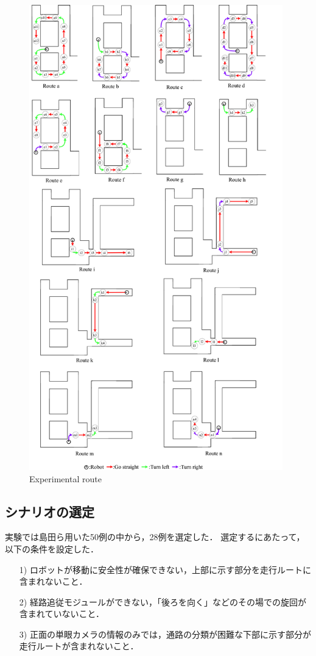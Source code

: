 \begin{figure}
  \centering
  \includegraphics[width=110mm]{images/pdf/ishiguro/route.pdf}
  \caption{Experimental route}
  \label{fig:route}
\end{figure}

\newpage
\subsection{シナリオの選定}
実験では島田ら用いた50例の中から，28例を選定した．
選定するにあたって，以下の条件を設定した．

\begin{enumerate}
  \item [1)] ロボットが移動に安全性が確保できない，上部に示す部分を走行ルートに含まれないこと．
  \item [2)] 経路追従モジュールができない，「後ろを向く」などのその場での旋回が含まれていないこと．
  \item [3)] 正面の単眼カメラの情報のみでは，通路の分類が困難な下部に示す部分が走行ルートが含まれないこと．
\end{enumerate}

